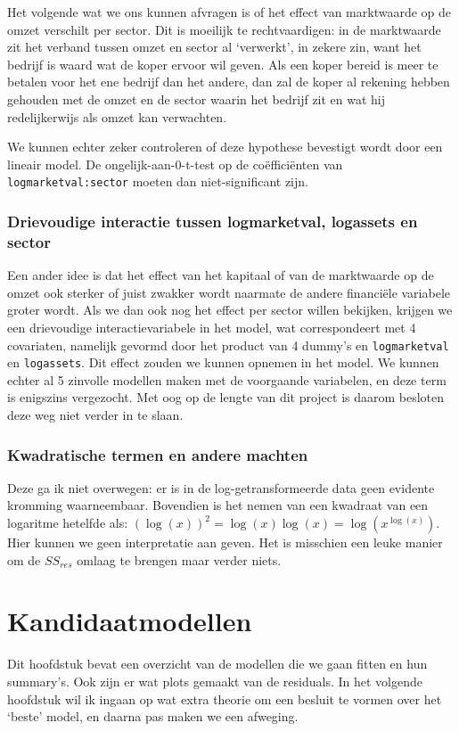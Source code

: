 \documentclass[a4paper, notitlepage]{report}
\begin{document}
  Het volgende wat we ons kunnen afvragen is of het effect van marktwaarde op de omzet verschilt per sector. Dit is moeilijk te rechtvaardigen: in de marktwaarde zit het verband tussen omzet en sector al `verwerkt', in zekere zin, want het bedrijf is waard wat de koper ervoor wil geven. Als een koper bereid is meer te betalen voor het ene bedrijf dan het andere, dan zal de koper al rekening hebben gehouden met de omzet en de sector waarin het bedrijf zit en wat hij redelijkerwijs als omzet kan verwachten.
  
  We kunnen echter zeker controleren of deze hypothese bevestigt wordt door een lineair model. De ongelijk-aan-0-t-test op de co\"effici\"enten van \verb!logmarketval:sector!  moeten dan niet-significant zijn.
  
\subsection{Drievoudige interactie tussen logmarketval, logassets en sector}
  Een ander idee is dat het effect van het kapitaal of van de marktwaarde op de omzet ook sterker of juist zwakker wordt naarmate de andere financi\"ele variabele groter wordt. Als we dan ook nog het effect per sector willen bekijken, krijgen we een drievoudige interactievariabele in het model, wat correspondeert met 4 covariaten, namelijk gevormd door het product van 4 dummy's en \verb!logmarketval! en \verb!logassets!. Dit effect zouden we kunnen opnemen in het model. We kunnen echter al 5 zinvolle modellen maken met de voorgaande variabelen, en deze term is enigszins vergezocht. Met oog op de lengte van dit project is daarom besloten deze weg niet verder in te slaan.

\subsection{Kwadratische termen en andere machten}
  Deze ga ik niet overwegen: er is in de log-getransformeerde data geen evidente kromming waarneembaar. Bovendien is het nemen van een kwadraat van een logaritme hetelfde als: $(\log(x))^2 = \log(x)\log(x) = \log(x^{\log(x)})$. Hier kunnen we geen interpretatie aan geven. Het is misschien een leuke manier om de $SS_{res}$ omlaag te brengen maar verder niets. 
  
   
\chapter*{Kandidaatmodellen}
  Dit hoofdstuk bevat een overzicht van de modellen die we gaan fitten en hun summary's. Ook zijn er wat plots gemaakt van de residuals. In het volgende hoofdstuk wil ik ingaan op wat extra theorie om een besluit te vormen over het `beste' model, en daarna pas maken we een afweging.
  
\end{document}
